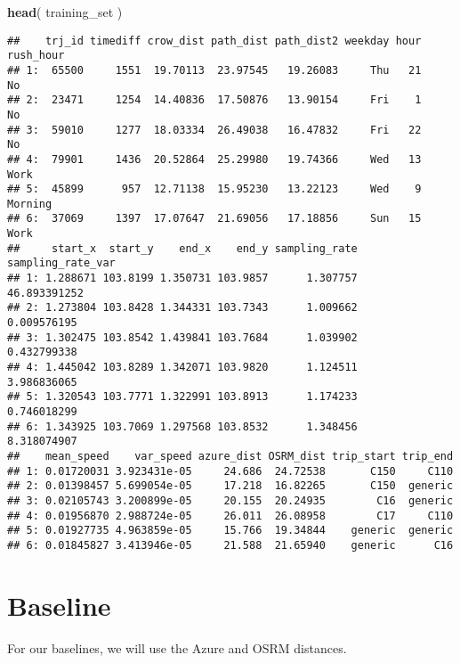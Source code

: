 \documentclass[]{article}
\newenvironment{Shaded}{\begin{snugshade}}{\end{snugshade}}
\newcommand{\DecValTok}[1]{\textcolor[rgb]{0.00,0.00,0.81}{#1}}
\newcommand{\KeywordTok}[1]{\textcolor[rgb]{0.13,0.29,0.53}{\textbf{#1}}}
\newcommand{\NormalTok}[1]{#1}
\newcommand{\OperatorTok}[1]{\textcolor[rgb]{0.81,0.36,0.00}{\textbf{#1}}}
\newcommand{\StringTok}[1]{\textcolor[rgb]{0.31,0.60,0.02}{#1}}
\begin{document}
\begin{Shaded}
\begin{Highlighting}[]
\KeywordTok{head}\NormalTok{( training_set )}
\end{Highlighting}
\end{Shaded}

\begin{verbatim}
##    trj_id timediff crow_dist path_dist path_dist2 weekday hour rush_hour
## 1:  65500     1551  19.70113  23.97545   19.26083     Thu   21        No
## 2:  23471     1254  14.40836  17.50876   13.90154     Fri    1        No
## 3:  59010     1277  18.03334  26.49038   16.47832     Fri   22        No
## 4:  79901     1436  20.52864  25.29980   19.74366     Wed   13      Work
## 5:  45899      957  12.71138  15.95230   13.22123     Wed    9   Morning
## 6:  37069     1397  17.07647  21.69056   17.18856     Sun   15      Work
##     start_x  start_y    end_x    end_y sampling_rate sampling_rate_var
## 1: 1.288671 103.8199 1.350731 103.9857      1.307757      46.893391252
## 2: 1.273804 103.8428 1.344331 103.7343      1.009662       0.009576195
## 3: 1.302475 103.8542 1.439841 103.7684      1.039902       0.432799338
## 4: 1.445042 103.8289 1.342071 103.9820      1.124511       3.986836065
## 5: 1.320543 103.7771 1.322991 103.8913      1.174233       0.746018299
## 6: 1.343925 103.7069 1.297568 103.8532      1.348456       8.318074907
##    mean_speed    var_speed azure_dist OSRM_dist trip_start trip_end
## 1: 0.01720031 3.923431e-05     24.686  24.72538       C150     C110
## 2: 0.01398457 5.699054e-05     17.218  16.82265       C150  generic
## 3: 0.02105743 3.200899e-05     20.155  20.24935        C16  generic
## 4: 0.01956870 2.988724e-05     26.011  26.08958        C17     C110
## 5: 0.01927735 4.963859e-05     15.766  19.34844    generic  generic
## 6: 0.01845827 3.413946e-05     21.588  21.65940    generic      C16
\end{verbatim}

\hypertarget{baseline}{%
\section{Baseline}\label{baseline}}

For our baselines, we will use the Azure and OSRM distances.

\begin{Shaded}
\end{Shaded}
\end{document}
